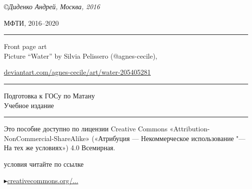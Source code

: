\slshape
\normalsize
{}
\thispagestyle{empty}
\medskip
\copyright\enspace Диденко Андрей, Москва, 2016

\medspace

МФТИ, 2016--2020
\center
\rule{\textwidth}{0.4pt}
\medspace

{\Huge Front page art}
\\[1\baselineskip]
Picture ``Water'' by Silvia Pelissero (@agnes-cecile),

\href{https://www.deviantart.com/agnes-cecile/art/water-205405281}{deviantart.com/agnes-cecile/art/water-205405281}

\rule{\textwidth}{0.4pt}
\medspace
\vspace*{7\baselineskip}

{\Huge Подготовка к ГОСу по Матану}
\\[2\baselineskip]
{\Large Учебное издание}

\vspace*{\fill}
\rule{\textwidth}{0.4pt}
\noindent
\begin{minipage}[t]{0.61\textwidth}
\quad\small Это пособие доступно по лицензии Creative Commons «Attribution-NonCommercial-ShareAlike» («Атрибуция — Некоммерческое использование "--- На тех же условиях») 4.0 Всемирная.

 условия читайте по ссылке

\qquad$\blacktriangleright$\href{https://creativecommons.org/licenses/by-nc-sa/4.0/deed.ru}{creativecommons.org/...}
\end{minipage}%
\hfill%
\begin{minipage}[t]{\dimexpr(0.4\textwidth-2mm)}
\end{minipage}
